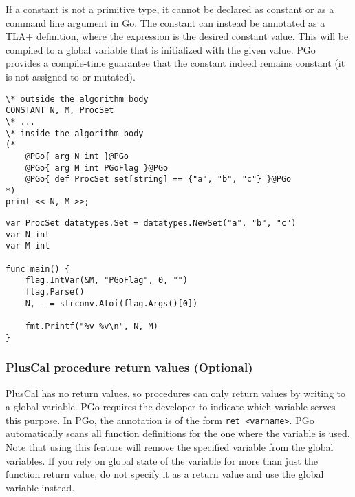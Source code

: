 If a constant is not a primitive type, it cannot be declared as constant or as a command line argument in Go. The constant can instead be annotated as a TLA+ definition, where the expression is the desired constant value. This will be compiled to a global variable that is initialized with the given value. PGo provides a compile-time guarantee that the constant indeed remains constant (it is not assigned to or mutated).

\noindent\begin{minipage}{\textwidth}
\begin{lstlisting}[language=pcal]
\* outside the algorithm body
CONSTANT N, M, ProcSet
\* ...
\* inside the algorithm body
(*
	@PGo{ arg N int }@PGo
	@PGo{ arg M int PGoFlag }@PGo
	@PGo{ def ProcSet set[string] == {"a", "b", "c"} }@PGo
*)
print << N, M >>;
\end{lstlisting}
\end{minipage}

\noindent\begin{minipage}{\textwidth}
\begin{lstlisting}[language=golang]
var ProcSet datatypes.Set = datatypes.NewSet("a", "b", "c")
var N int
var M int

func main() {
	flag.IntVar(&M, "PGoFlag", 0, "")
	flag.Parse()
	N, _ = strconv.Atoi(flag.Args()[0])

	fmt.Printf("%v %v\n", N, M)
}
\end{lstlisting}
\end{minipage}

\noindent{}

\subsubsection{PlusCal procedure return values (Optional)}
PlusCal has no return values, so procedures can only return values by writing to a global variable. PGo requires the developer to indicate which variable serves this purpose. In PGo, the annotation is of the form \texttt{ret <varname>}. PGo automatically scans all function definitions for the one where the variable is used. Note that using this feature will remove the specified variable from the global variables. If you rely on global state of the variable for more than just the function return value, do not specify it as a return value and use the global variable instead.

